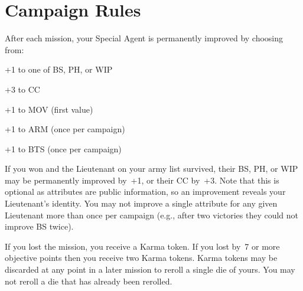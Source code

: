 \chapter{Campaign Rules}

  After each mission, your Special Agent is
permanently improved by choosing from:

\begin{squishitemize}
\item +1 to one of BS, PH, or WIP
\item +3 to CC
\item +1 to MOV (first value)
\item +1 to ARM (once per campaign)
\item +1 to BTS (once per campaign)
\end{squishitemize}

If you won and the Lieutenant on your army list survived, their BS,
PH, or WIP may be permanently improved by~+1, or their CC by~+3.  Note
that this is optional as attributes are public information, so an
improvement reveals your Lieutenant's identity.  You may not improve a
single attribute for any given Lieutenant more than once per campaign
(e.g., after two victories they could not improve BS twice).
  
If you lost the mission, you receive a Karma token.  If you lost by~7
or more objective points then you receive two Karma tokens.  Karma
tokens may be discarded at any point in a later mission to reroll a
single die of yours.  You may not reroll a die that has already been
rerolled.

